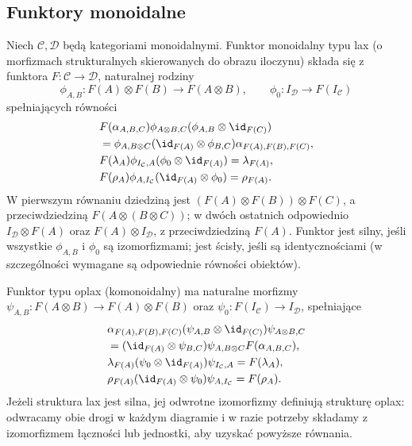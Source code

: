\subsection{Funktory monoidalne}
\begin{definicja}\label{cat:def:lax-monoidal}
Niech $\mathcal C,\mathcal D$ będą kategoriami monoidalnymi. Funktor monoidalny typu lax (o morfizmach strukturalnych skierowanych do obrazu iloczynu) składa się z funktora $F:\mathcal C\to\mathcal D$, naturalnej rodziny
\[
\phi_{A,B}:F(A)\otimes F(B)\to F(A\otimes B),\qquad
\phi_0:I_{\mathcal D}\to F(I_{\mathcal C})
\]
spełniających równości
\[
\begin{aligned}
&F(\alpha_{A,B,C})\phi_{A\otimes B,C}(\phi_{A,B}\otimes\id_{F(C)})\\
&=\phi_{A,B\otimes C}(\id_{F(A)}\otimes\phi_{B,C})\alpha_{F(A),F(B),F(C)},\\
&F(\lambda_A)\phi_{I_{\mathcal C},A}(\phi_0\otimes\id_{F(A)})=\lambda_{F(A)},\\
&F(\rho_A)\phi_{A,I_{\mathcal C}}(\id_{F(A)}\otimes\phi_0)=\rho_{F(A)}.
\end{aligned}
\]
W pierwszym równaniu dziedziną jest $(F(A)\otimes F(B))\otimes F(C)$, a przeciwdziedziną $F(A\otimes(B\otimes C))$; w dwóch ostatnich odpowiednio $I_{\mathcal D}\otimes F(A)$ oraz $F(A)\otimes I_{\mathcal D}$, z przeciwdziedziną $F(A)$. Funktor jest silny, jeśli wszystkie $\phi_{A,B}$ i $\phi_0$ są izomorfizmami; jest ścisły, jeśli są identycznościami (w szczególności wymagane są odpowiednie równości obiektów).
\end{definicja}

\begin{definicja}\label{cat:def:oplax-monoidal}
Funktor typu oplax (komonoidalny) ma naturalne morfizmy $\psi_{A,B}:F(A\otimes B)\to F(A)\otimes F(B)$ oraz $\psi_0:F(I_{\mathcal C})\to I_{\mathcal D}$, spełniające
\[
\begin{aligned}
&\alpha_{F(A),F(B),F(C)}(\psi_{A,B}\otimes\id_{F(C)})\psi_{A\otimes B,C}\\
&=(\id_{F(A)}\otimes\psi_{B,C})\psi_{A,B\otimes C}F(\alpha_{A,B,C}),\\
&\lambda_{F(A)}(\psi_0\otimes\id_{F(A)})\psi_{I_{\mathcal C},A}=F(\lambda_A),\\
&\rho_{F(A)}(\id_{F(A)}\otimes\psi_0)\psi_{A,I_{\mathcal C}}=F(\rho_A).
\end{aligned}
\]
Jeżeli struktura lax jest silna, jej odwrotne izomorfizmy definiują strukturę oplax: odwracamy obie drogi w każdym diagramie i w razie potrzeby składamy z izomorfizmem łączności lub jednostki, aby uzyskać powyższe równania.
\end{definicja}

